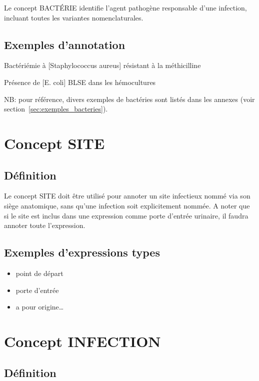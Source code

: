 Le concept BACTÉRIE identifie l'agent pathogène responsable d'une infection, incluant toutes les variantes nomenclaturales.

\subsection{Exemples d'annotation}

\checkmark Bactériémie à [Staphylococcus aureus] résistant à la méthicilline

\checkmark Présence de [E. coli] BLSE dans les hémocultures

NB: pour référence, divers exemples de bactéries sont listés dans les annexes (voir section~\ref{sec:exemples_bacteries}).

\section{Concept SITE}

\subsection{Définition}

Le concept SITE doit être utilisé pour annoter un site infectieux nommé via son siège anatomique, sans qu’une infection soit explicitement nommée.
A noter que si le site est inclus dans une expression comme porte d'entrée urinaire, il faudra annoter toute l'expression.

\subsection{Exemples d'expressions types}

\begin{itemize}
    \item point de départ
    \item porte d'entrée
    \item a pour origine\ldots
\end{itemize}


\section{Concept INFECTION}

\subsection{Définition}

